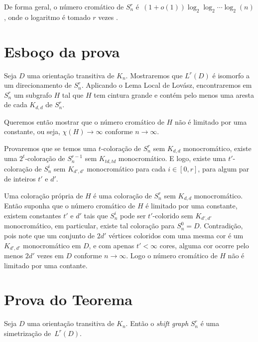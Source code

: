 De forma geral, o número cromático de $S_n^r$ é~$(1+o(1))\log_2 \log_2 \cdots \log_2 (n)$, onde o logaritmo é tomado $r$ vezes \cite{erdos1968chromatic}.


\section{Esboço da prova}

Seja $D$ uma orientação transitiva de $K_n$. Mostraremos que $L^r(D)$ é isomorfo a um direcionamento de $S_n^r$. Aplicando o Lema Local de Lovász, encontraremos em $S_n^r$ um subgrafo $H$ tal que $H$ tem cintura grande e contém pelo menos uma aresta de cada $K_{d,d}$ de $S_n^r$.

Queremos então mostrar que o número cromático de $H$ não é limitado por uma constante, ou seja, $\chi(H) \rightarrow \infty$ conforme $n \rightarrow \infty$.

Provaremos que se temos uma $t$-coloração de $S_n^r$ sem $K_{d,d}$ monocromático, existe uma $2^t$-coloração de $S_n^{r-1}$ sem $K_{td,td}$ monocromático. E logo, existe uma $t'$-coloração de $S_n^i$ sem $K_{d',d'}$ monocromático para cada $i\in [0,r]$, para algum par de inteiros $t'$ e $d'$.

Uma coloração própria de $H$ é uma coloração de $S_n^r$ sem $K_{d,d}$ monocromático. Então suponha que o número cromático de $H$ é limitado por uma constante, existem constantes $t'$ e $d'$ tais que $S_n^i$ pode ser $t'$-colorido sem $K_{d',d'}$ monocromático, em particular, existe tal coloração para $S_n^0 = D$. Contradição, pois note que um conjunto de $2d'$ vértices coloridos com uma mesma cor é um $K_{d',d'}$ monocromático em $D$, e com apenas $t' < \infty$ cores, alguma cor ocorre pelo menos $2d'$ vezes em $D$ conforme $n\rightarrow\infty$. Logo o número cromático de $H$ não é limitado por uma contante.

\section{Prova do Teorema}

\begin{afirmacao}\label{shiftafirm1}
Seja $D$ uma orientação transitiva de $K_n$. Então o \textit{shift graph} $S_n^r$ é uma simetrização de~$L^r(D)$.
\end{afirmacao}

